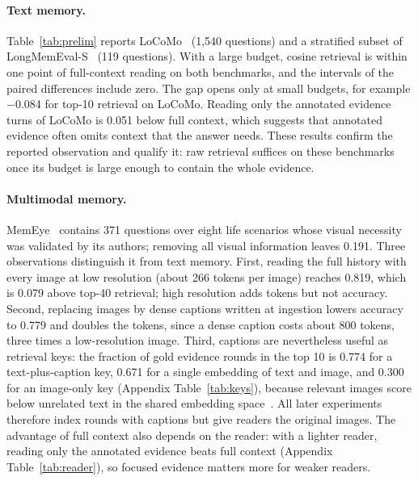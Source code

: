 \paragraph{Text memory.} Table~\ref{tab:prelim} reports LoCoMo~\citep{maharana2024locomo} (1,540 questions) and a stratified subset of LongMemEval-S~\citep{wu2025longmemeval} (119 questions). With a large budget, cosine retrieval is within one point of full-context reading on both benchmarks, and the intervals of the paired differences include zero. The gap opens only at small budgets, for example $-0.084$ for top-10 retrieval on LoCoMo. Reading only the annotated evidence turns of LoCoMo is 0.051 below full context, which suggests that annotated evidence often omits context that the answer needs. These results confirm the reported observation and qualify it: raw retrieval suffices on these benchmarks once its budget is large enough to contain the whole evidence.

\paragraph{Multimodal memory.} MemEye~\citep{guo2026memeye} contains 371 questions over eight life scenarios whose visual necessity was validated by its authors; removing all visual information leaves 0.191. Three observations distinguish it from text memory. First, reading the full history with every image at low resolution (about 266 tokens per image) reaches 0.819, which is 0.079 above top-40 retrieval; high resolution adds tokens but not accuracy. Second, replacing images by dense captions written at ingestion lowers accuracy to 0.779 and doubles the tokens, since a dense caption costs about 800 tokens, three times a low-resolution image. Third, captions are nevertheless useful as retrieval keys: the fraction of gold evidence rounds in the top 10 is 0.774 for a text-plus-caption key, 0.671 for a single embedding of text and image, and 0.300 for an image-only key (Appendix Table~\ref{tab:keys}), because relevant images score below unrelated text in the shared embedding space~\citep{liang2022modalitygap}. All later experiments therefore index rounds with captions but give readers the original images. The advantage of full context also depends on the reader: with a lighter reader, reading only the annotated evidence beats full context (Appendix Table~\ref{tab:reader}), so focused evidence matters more for weaker readers.

